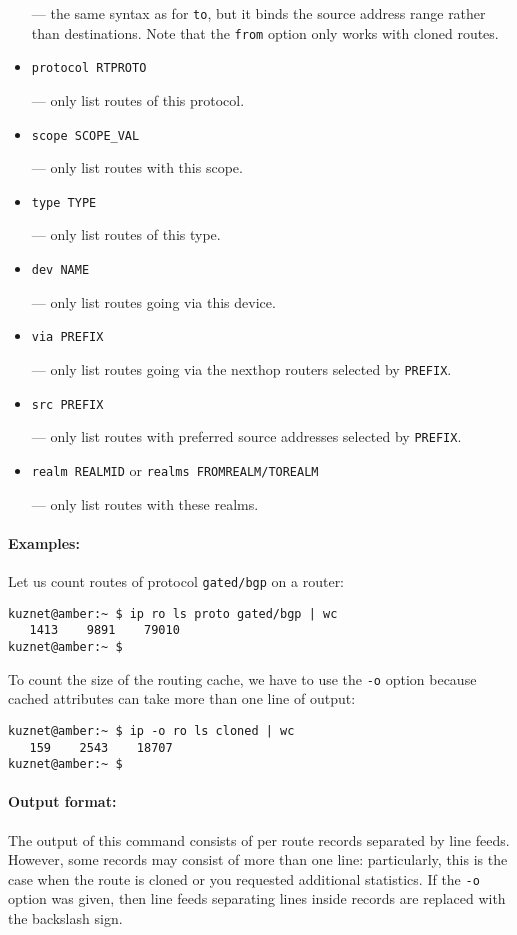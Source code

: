 \begin{itemize}
--- the same syntax as for \verb|to|, but it binds the source address range
rather than destinations. Note that the \verb|from| option only works with
cloned routes.

\item \verb|protocol RTPROTO|

--- only list routes of this protocol.


\item \verb|scope SCOPE_VAL|

--- only list routes with this scope.

\item \verb|type TYPE|

--- only list routes of this type.

\item \verb|dev NAME|

--- only list routes going via this device.

\item \verb|via PREFIX|

--- only list routes going via the nexthop routers selected by \verb|PREFIX|.

\item \verb|src PREFIX|

--- only list routes with preferred source addresses selected
by \verb|PREFIX|.

\item \verb|realm REALMID| or \verb|realms FROMREALM/TOREALM|

--- only list routes with these realms.

\end{itemize}

\paragraph{Examples:} Let us count routes of protocol \verb|gated/bgp|
on a router:
\begin{verbatim}
kuznet@amber:~ $ ip ro ls proto gated/bgp | wc
   1413    9891    79010
kuznet@amber:~ $
\end{verbatim}
To count the size of the routing cache, we have to use the \verb|-o| option
because cached attributes can take more than one line of output:
\begin{verbatim}
kuznet@amber:~ $ ip -o ro ls cloned | wc
   159    2543    18707
kuznet@amber:~ $
\end{verbatim}


\paragraph{Output format:} The output of this command consists
of per route records separated by line feeds.
However, some records may consist
of more than one line: particularly, this is the case when the route
is cloned or you requested additional statistics. If the
\verb|-o| option was given, then line feeds separating lines inside
records are replaced with the backslash sign.

